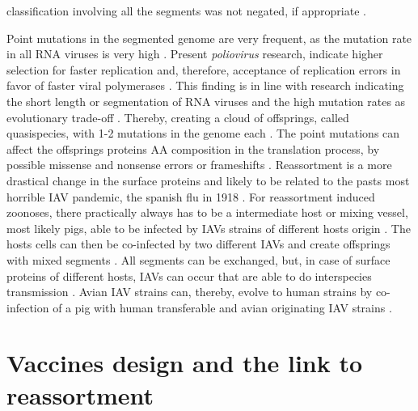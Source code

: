 classification involving all the segments was not negated, if appropriate \autocite{noauthor_reconsideration_1979}. %

\vspace{1em}

Point mutations in the segmented genome are very frequent, as the mutation rate in all RNA viruses is very high \autocite{duffy_why_2018}. Present \textit{poliovirus} research, indicate higher selection for faster replication and, therefore, acceptance of replication errors in favor of faster viral polymerases \autocite{pfeiffer_increased_2005, duffy_why_2018}. This finding is in line with research indicating the short length or segmentation of RNA viruses and the high mutation rates as evolutionary trade-off \autocite{belshaw_pacing_2008, vignuzzi_closing_2012}. Thereby, creating a cloud of offsprings, called quasispecies, with 1-2 mutations in the genome each \autocite{belshaw_pacing_2008, vignuzzi_closing_2012}. The point mutations can affect the offsprings proteins \gls{AA} composition in the translation process, by possible missense and nonsense errors or frameshifts \autocite{parker_errors_1989, webster_chapter_1999}. Reassortment is a more drastical change in the surface proteins and likely to be related to the pasts most horrible \gls{IAV} pandemic, the spanish flu in 1918 \autocite{nelson_multiple_2008}. For reassortment induced zoonoses, there practically always has to be a intermediate host or \glqq mixing vessel\grqq{}, most likely pigs, able to be infected by \glspl{IAV} strains of different hosts origin \autocite{shu_evidence_1994}. The hosts cells can then be co-infected by two different \glspl{IAV} and create offsprings with mixed segments \autocite{compans_influenza_2014}. All segments can be exchanged, but, in case of surface proteins of different hosts, \glspl{IAV} can occur that are able to do interspecies transmission \autocite{shu_evidence_1994}. Avian \gls{IAV} strains can, thereby, evolve to human strains by co-infection of a pig with human transferable and avian originating \gls{IAV} strains \autocite{shu_evidence_1994}. 

\section{Vaccines design and the link to reassortment}

